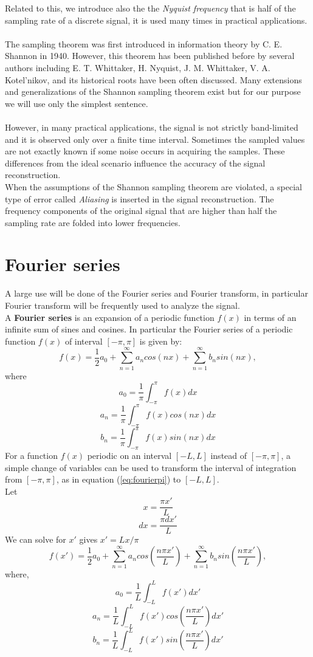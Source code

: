Related to this, we introduce also the the \textit{Nyquist frequency} that is half of the sampling rate of a discrete signal, it is used many times in practical applications.\\\\
The sampling theorem was first introduced in information theory by C. E. Shannon in 1940. However, this theorem has been published before by several authors including E. T. Whittaker, H. Nyquist, J. M. Whittaker, V. A. Kotel’nikov, and its historical roots have been often discussed. Many extensions and generalizations of the Shannon sampling theorem exist but for our purpose we will use only the simplest sentence.\\\\
However, in many practical applications, the signal is not strictly band-limited and it is observed only over a finite time interval. Sometimes the sampled values are not exactly known if some noise occurs in acquiring the samples. These differences from the ideal scenario influence the accuracy of the signal reconstruction.\\
When the assumptions of the Shannon sampling theorem are violated, a special type of error called \textit{Aliasing} is inserted in the signal reconstruction. The frequency components of the original signal that are higher than half the sampling rate are folded into lower frequencies.

\section{Fourier series}
A large use will be done of the Fourier series and Fourier transform, in particular Fourier transform will be frequently used to analyze the signal.\\
A \textbf{Fourier series} is an expansion of a periodic function $f(x)$ in terms of an infinite sum of sines and cosines. In particular the Fourier series of a periodic function $f(x)$ of interval $[-\pi,\pi]$ is given by:
\begin{equation}
 f(x) = \frac{1}{2}a_0 + \sum_{n=1}^\infty a_n cos(nx) + \sum_{n=1}^\infty b_n sin(nx),
 \label{eq:fourierpi}
\end{equation}
where
\[ a_0 = \frac{1}{\pi} \int_{-\pi}^\pi f(x) dx \]
\[ a_n = \frac{1}{\pi} \int_{-\pi}^\pi f(x)cos(nx) dx \]
\[ b_n = \frac{1}{\pi} \int_{-\pi}^\pi f(x)sin(nx) dx \]
For a function $f(x)$ periodic on an interval $[-L,L]$ instead of $[-\pi,\pi]$, a simple change of variables can be used to transform the interval of integration from $[-\pi,\pi]$, as in equation (\ref{eq:fourierpi}) to $[-L,L]$. \\
Let
\[ x=\frac{\pi x'}{L} \]
\[ dx=\frac{\pi dx'}{L} \]
We can solve for $x'$ gives $x'=Lx/\pi$
\begin{equation}
 f(x') = \frac{1}{2}a_0 + \sum_{n=1}^\infty a_n cos(\frac{n\pi x'}{L}) + \sum_{n=1}^\infty b_n sin(\frac{n\pi x'}{L}),
\end{equation}
where,
\[ a_0 = \frac{1}{L} \int_{-L}^L f(x') dx' \]
\[ a_n = \frac{1}{L} \int_{-L}^L f(x')cos(\frac{n\pi x'}{L}) dx' \]
\[ b_n = \frac{1}{L} \int_{-L}^L f(x')sin(\frac{n\pi x'}{L}) dx' \]


